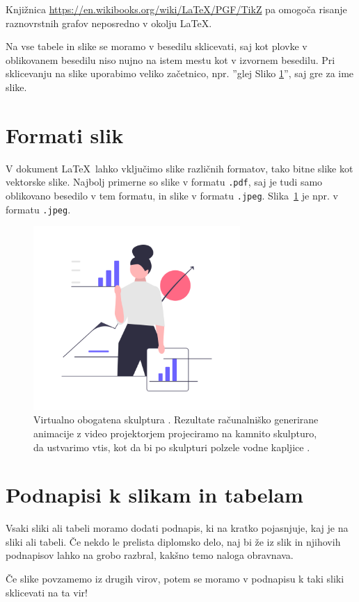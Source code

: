 Knjižnica \url{https://en.wikibooks.org/wiki/LaTeX/PGF/TikZ}
pa omo\-go\-ča risanje raznovrstnih grafov neposredno v okolju \LaTeX .

Na vse tabele in slike se moramo v besedilu sklicevati, saj kot plovke v oblikovanem besedilu
niso nujno na istem mestu kot v izvornem besedilu.
Pri sklicevanju na slike uporabimo veliko začetnico, npr. ''glej Sliko \ref{pic1}'',
saj gre za ime slike.

\section{Formati slik}

V dokument \LaTeX\ lahko vključimo slike različnih formatov, tako
bitne slike kot vektorske slike. Najbolj primerne so slike v formatu {\tt .pdf}, saj je tudi samo
oblikovano besedilo v tem formatu, in slike v formatu {\tt .jpeg}.
Slika~\ref{pic1} je npr. v formatu {\tt .jpeg}.

\begin{figure}[htb]
    \begin{center}
        \includegraphics[width=0.7\textwidth]{resources/images/projections}
    \end{center}
    \caption{Virtualno obogatena skulptura \cite{vodnjak}.
        Rezultate računalniško generirane animacije z video projektorjem projeciramo na kamnito
        skulpturo, da ustvarimo vtis, kot da bi po skulpturi polzele vodne kapljice
        \cite{video,solina2020skulpture}.}
    \label{pic1}
\end{figure}



\section{Podnapisi k slikam in tabelam}

Vsaki sliki ali tabeli moramo dodati podnapis, ki na kratko pojasnjuje, kaj je na sliki ali tabeli.
Če nekdo le prelista diplomsko delo, naj bi že iz slik in njihovih podnapisov lahko na grobo razbral, kakšno temo naloga obravnava.

Če slike povzamemo iz drugih virov, potem se moramo v podnapisu k taki sliki sklicevati na ta vir!
